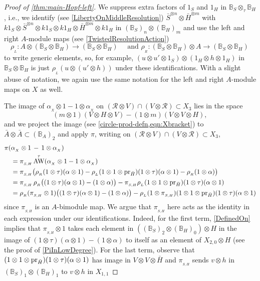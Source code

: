 \documentclass[11pt]{amsart}
\numberwithin{equation}{section}
\newcommand{\X}{_X}
\newcommand{\alphax}{\alpha_{\X}}
\newcommand{\pr}{ {\rm{pr}} }%
\newcommand{\R}{\mathcal{R}}
\newcommand{\BB}{\mathbb{B}} %
\DeclareMathOperator{\AW}{AW}
\DeclareMathOperator{\AWt}{\AW^{\tau}}
\renewcommand{\_}[1]{\mbox{$_{\left( #1 \right)}$}}
\newcommand{\ot}{\otimes}
\newcommand{\ott}{\otimes_{\tau}}
\begin{document}
{\begin{proof}[Proof of \cref{thm:main-Hopf-left}]
We suppress extra factors of $1_S$ and $1_H$ in $\BB_S\ott \BB_H$,
i.e., we identify (see \cref{LibertyOnMiddleResolution})
$\bar{S}^{\ot n}\ot \bar{H}^{\ot m}$ with
$k1_S\ot \bar{S}^{\ot n}\ot k1_S\ot k1_H \ot\bar{H}^{\ot m}\ot k1_H$
in $(\BB_S)_n\ot (\BB_H)_m$
and use the left and right
$A$-module maps (see \cref{TwistedResolutionAction})
$$
\rho_{_L}:A\ot (\BB_S\ot \BB_H)\rightarrow (\BB_S\ot \BB_H)
\quad\text{ and }
\rho_{_R}:(\BB_S\ot \BB_H)\ot A\rightarrow (\BB_S\ot \BB_H)
\, 
$$
to write generic elements, so, for example,
$(u\ot u'\ot 1_S)\ot (1_H\ot h\ot 1_H)$ in $\BB_S\ot \BB_H$
is just $\rho_{_L}(u\ot (u'\ot h))$ under these identifications.
With a slight abuse of notation, we again use the same notation for the
left and right $A$-module maps on $X$ as well.


The image of $\alphax\ot 1 - 1\ot\alphax$ on 
$(\R\ot V)\cap (V\ot \R)\subset X_3$
lies in the space 
$$(m\ot 1)(V\ot H\ot V)-(1\ot m)(V\ot V\ot H),$$
and we project the image (see \cref{circle-prod-defn,eqn:Xbracket}) 
to 
$\bar A\ot \bar A\subset (\BB_A)_2$
and apply $\pi$, 
writing 
on $(\R\ot V)\cap (V\ot \R)\subset X_3$,
$$
\begin{aligned}
\pi( & \alphax \ot 1\, -\,  1\ot \alphax) 
\\ &=
\pi_{_{S,H}}\AWt(\alphax\ot 1 - 1\ot \alphax)
\\ &=
\pi_{_{S,H}}\big(\rho_{_R}(1\ot \tau)(\alpha\ot 1) 
-\rho_{_L}(1\ot 1\ot \pr_{\bar H})(1\ot \tau)(\alpha\ot 1) -\rho_{_R}(1\ot \alpha) \big)
\\ &=
\pi_{_{S,H}}\, 
\rho_{_R}\big((1\ot \tau)(\alpha\ot 1) -(1\ot \alpha) \big) 
-\pi_{_{S,H}}\rho_{_L}(1\ot 1\ot \pr_{\bar H}) (1\ot \tau)(\alpha\ot 1)
\\ &=
\rho_{_R}(\pi_{_{S,H}}\ot 1)
\big((1\ot \tau)(\alpha\ot 1) -(1\ot \alpha) \big) 
-\rho_{_L}
(1\ot \pi_{_{S,H}})
(1\ot 1\ot \pr_{\bar H})
(1\ot \tau)(\alpha\ot 1) 
\end{aligned}
$$
since $\pi_{_{S,H}}$ is an $A$-bimodule map.
We argue that $\pi_{_{S,H}}$ here acts as the identity in each
expression under our identifications.
Indeed,
for the first term, \cref{DefinedOn} implies that
$\pi_{_{S,H}}\ot 1$ takes each element in
$((\BB_S)_2\ot (\BB_H)_0)\ot
H$
in the image of
$(1\ot \tau)(\alpha\ot 1) -(1\ot \alpha)$
to itself
as an element of $X_{2,0}\ot H$
(see the proof of \cref{PiInLowDegree}).
For the last term, observe that $(1\ot 1\ot \pr_{\bar H}) (1\ot \tau)(\alpha\ot 1)$
has image in $V\ot V\ot \bar H$
and $\pi_{_{S,H}}$ sends
$ v\ot h$ in $(\BB_S)_1\ot (\BB_H)_1$
to $v\ot h$ in $X_{1,1}$ 

\end{proof}}
\end{document}

